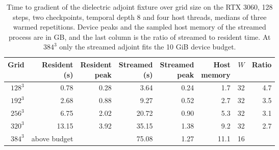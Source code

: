 \begin{table}[tbp]
\centering
\small
\renewcommand{\arraystretch}{1.15}
\caption{Time to gradient of the dielectric adjoint fixture over grid size on the RTX 3060, 128 steps, two checkpoints, temporal depth 8 and four host threads, medians of three warmed repetitions. Device peaks and the sampled host memory of the streamed process are in GB, and the last column is the ratio of streamed to resident time. At $384^3$ only the streamed adjoint fits the 10 GiB device budget.}
\label{tab:si-scaling-adjoint}
\begin{tabular}{@{}rrrrrrrr@{}}
\toprule
Grid & \shortstack{Resident\\(s)} & \shortstack{Resident\\peak} & \shortstack{Streamed\\(s)} & \shortstack{Streamed\\peak} & \shortstack{Host\\memory} & $W$ & Ratio \\
\midrule
$128^3$ & 0.78 & 0.28 & 3.64 & 0.24 & 1.7 & 32 & 4.7 \\
$192^3$ & 2.68 & 0.88 & 9.27 & 0.52 & 2.7 & 32 & 3.5 \\
$256^3$ & 6.75 & 2.02 & 20.72 & 0.90 & 5.3 & 32 & 3.1 \\
$320^3$ & 13.15 & 3.92 & 35.15 & 1.38 & 9.2 & 32 & 2.7 \\
$384^3$ & above budget &  & 75.08 & 1.27 & 11.1 & 16 &  \\
\bottomrule
\end{tabular}
\end{table}
